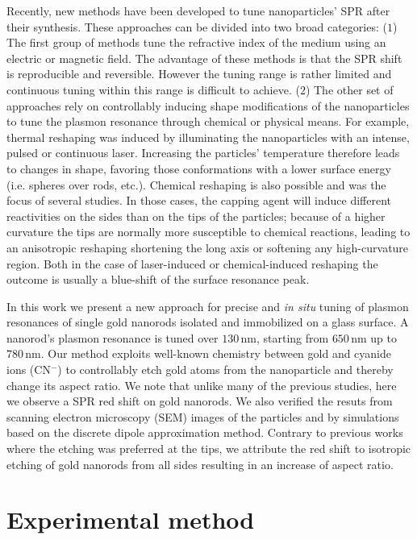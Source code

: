 \documentclass[twoside,twocolumn,11pt]{article}
\newcommand{\nm}{\ensuremath{\,\textrm{nm}}}
\begin{document}
Recently, new methods have been developed to tune nanoparticles' SPR after their
synthesis. These approaches can be divided into two broad categories: ($1$) The
first group of methods tune the refractive index of the medium using an electric
or magnetic field\cite{Kossyrev2005}. The advantage of these methods is that the
SPR shift is reproducible and reversible. However the tuning range is rather
limited and continuous tuning within this range is difficult to achieve. ($2$)
The other set of approaches rely on controllably inducing shape modifications of
the nanoparticles to tune the plasmon resonance through chemical or physical
means. For example, thermal reshaping was induced by illuminating the
nanoparticles with an intense, pulsed  \cite{Link2000,Horiguchi2008} or
continuous laser\cite{Yorulmaz2012}. Increasing the particles' temperature
therefore leads to changes in shape, favoring those conformations with a lower
surface energy (i.e. spheres over rods, etc.). Chemical reshaping is also
possible and was the focus of several
studies\cite{Carbo-Argibay2007,Rodriguez-Fernandez2005,Jana2002,Tsung2006,Ni2008}.
In those cases, the capping agent will induce different reactivities on the sides than on
the tips of the particles; because of a higher curvature\cite{Yuan2015} the tips
are normally more susceptible to chemical reactions, leading to an anisotropic
reshaping shortening the long axis or softening any high-curvature region. Both
in the case of laser-induced or chemical-induced reshaping the outcome is
usually a blue-shift of the surface resonance peak.

In this work we present a new approach for precise and \textit{in situ} tuning
of plasmon resonances of single gold nanorods isolated and immobilized on a glass
surface. A nanorod's plasmon resonance is tuned over $130\nm$, starting from
$650\nm$ up to $780\nm$. Our method exploits well-known chemistry between gold
and cyanide ions (CN$^{-}$) to controllably etch gold atoms from the
nanoparticle and thereby change its aspect ratio. We note that unlike many of
the previous studies, here we observe a SPR red shift on gold nanorods. We also
verified the resuts from scanning electron microscopy (SEM) images of the
particles and by simulations based on the discrete dipole approximation method.
Contrary to previous works where the etching was preferred at the tips, we
attribute the red shift to isotropic etching of gold nanorods from all sides
resulting in an increase of aspect ratio.

\section{Experimental method}
\end{document}
